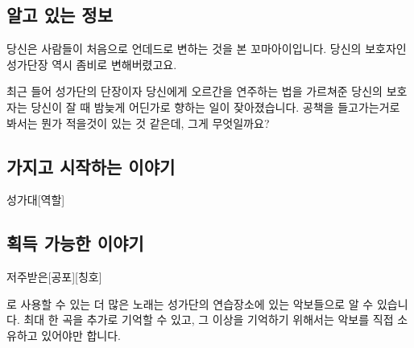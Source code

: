 \documentclass{report}
\begin{document}
	\subsection*{알고 있는 정보}
		당신은 사람들이 처음으로 언데드로 변하는 것을 본 꼬마아이입니다. 당신의 보호자인 성가단장 역시 좀비로 변해버렸고요.
		
		최근 들어 성가단의 단장이자 당신에게 오르간을 연주하는 법을 가르쳐준 당신의 보호자는 당신이 잘 때 밤늦게 어딘가로 향하는 일이 잦아졌습니다. 공책을 들고가는거로 봐서는 뭔가 적을것이 있는 것 같은데, 그게 무엇일까요?
	
	\subsection*{가지고 시작하는 이야기}
		\begin{spoiler}{성가대}{[역할]}
			
			
		\end{spoiler}
	
	\subsection*{획득 가능한 이야기}
		\begin{spoiler}{저주받은}{[공포][칭호]}
			
			
		\end{spoiler}
	
	\bigskip
	
	로 사용할 수 있는 더 많은 노래는 성가단의 연습장소에 있는 악보들으로 알 수 있습니다. 최대 한 곡을 추가로 기억할 수 있고, 그 이상을 기억하기 위해서는 악보를 직접 소유하고 있어야만 합니다.
\end{document}
